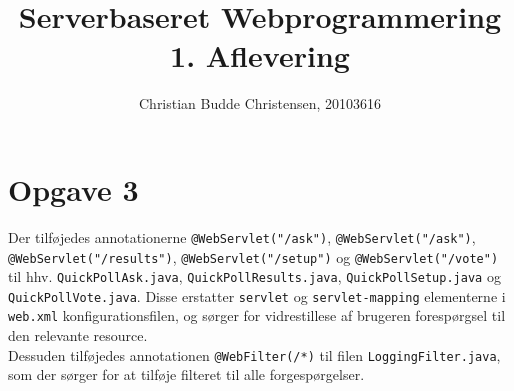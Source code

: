 \documentclass[a4paper,10pt]{article}
\author{Christian Budde Christensen, 20103616}
\title{Serverbaseret Webprogrammering\\1. Aflevering}
\begin{document}
\maketitle
\section*{Opgave 3}
Der tilføjedes annotationerne \texttt{@WebServlet("/ask")}, \texttt{@WebServlet("/ask")}, \texttt{@WebServlet("/results")}, \texttt{@WebServlet("/setup")} og \texttt{@WebServlet("/vote")} til hhv. \texttt{QuickPollAsk.java}, \texttt{QuickPollResults.java}, \texttt{QuickPollSetup.java} og \texttt{QuickPollVote.java}. Disse erstatter \texttt{servlet} og \texttt{servlet-mapping} elementerne i \texttt{web.xml} konfigurationsfilen, og sørger for vidrestillese af brugeren forespørgsel til den relevante resource. \\
Dessuden tilføjedes annotationen \texttt{@WebFilter(/*)} til filen \texttt{LoggingFilter.java}, som der sørger for at tilføje filteret til alle forgespørgelser.\\
\end{document}
